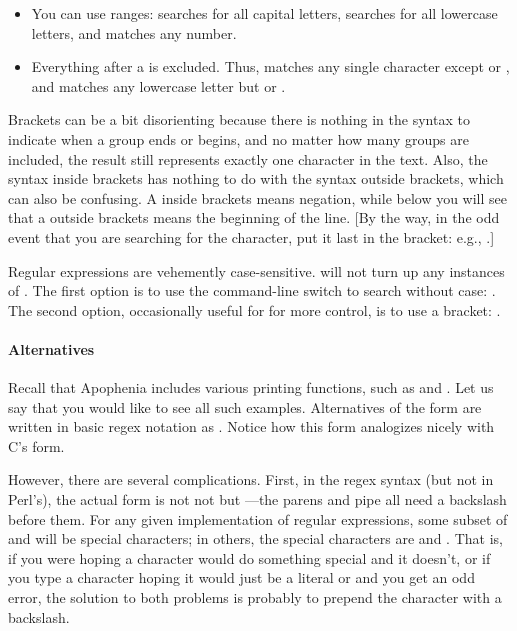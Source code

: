 \begin{itemize}
\item You can use ranges: \ci{[A-Z]} searches for all capital letters,
\ci{[A-Za-z]} searches for all lowercase letters, and \ci{[0-9]} matches
any number. 
\item {} Everything after a \ci{\that} is excluded. Thus, \ci{[\that{}fs]} matches
any single character except  or , and
\ci{[a-z\that{}fs]} matches any lowercase letter
but  or .
\end{itemize}
Brackets can be a bit disorienting because there is nothing in the syntax
to indicate when a group ends or begins, and no matter how many groups are
included, the result still represents exactly one character in the text.
Also, the syntax inside brackets has nothing to do with the syntax
outside brackets, which can also be confusing. A \that{} inside brackets
means negation, while below you will see that a \that{} outside brackets
means the beginning of the line. [By the way, in the odd event that you are searching for the \that{} character, 
put it last in the bracket: e.g., .]

Regular expressions are vehemently case-sensitive.  will not turn up any instances of . The first
option is to use the  command-line switch to search without case:
. The second option, occasionally useful
for for more control, is to use a bracket: .

\paragraph{Alternatives} 
Recall that Apophenia includes various printing functions, such as
 and . Let us say that you
would like to see all such examples. Alternatives of the form  are written in basic regex notation as . Notice how this
form analogizes nicely with C's  form.

However, there are several complications. First, in the
 regex syntax (but not in Perl's), the actual form is not
not  but ---the
parens and pipe all need a backslash before them. For any given
implementation of regular expressions, some subset of 
and \ci{\}} will be special characters; in others, the special characters are
 and \ci{\textbs\}}.
That is, if you were hoping a character would do something special and it
doesn't,  or if you type a character hoping
it would just be a literal \ci{+} or \ci{|} and you get an odd error,
the solution to both problems is probably to prepend the character with a backslash.

